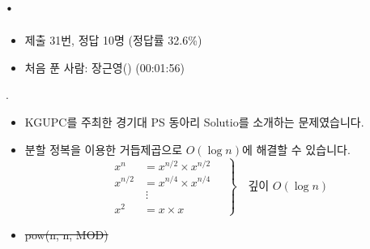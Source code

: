 
\section{\texorpdfstring{\pletter. \ptitle}{문제 \pletter}}

\begin{frame}[label=problem-A]
    \sectiontitle{\pletter}{\ptitle}

    \begin{itemize}
        \item 제출 31번, 정답 10명 (정답률 32.6\%)
        \item 처음 푼 사람: 장근영() (00:01:56)
    \end{itemize}
\end{frame}

\begin{frame}[fragile]{\textbf{\pletter}. \ptitle}
     \begin{itemize}
        \item KGUPC를 주최한 경기대 PS 동아리 Solutio를 소개하는 문제였습니다.
        \item 분할 정복을 이용한 거듭제곱으로 $O(\log n)$에 해결할 수 있습니다.
        \[
        \left.
        \begin{aligned}
            x^n     &= x^{n/2} \times x^{n/2} \\
            x^{n/2} &= x^{n/4} \times x^{n/4} \\
                    &\ \vdots \\
            x^2     &= x \times x
        \end{aligned}
        \quad\right\}\quad \text{깊이 } O(\log n)
        \]
        \item {\consolas\small\sout{pow(n, n, MOD)}}
    \end{itemize}
\end{frame}
